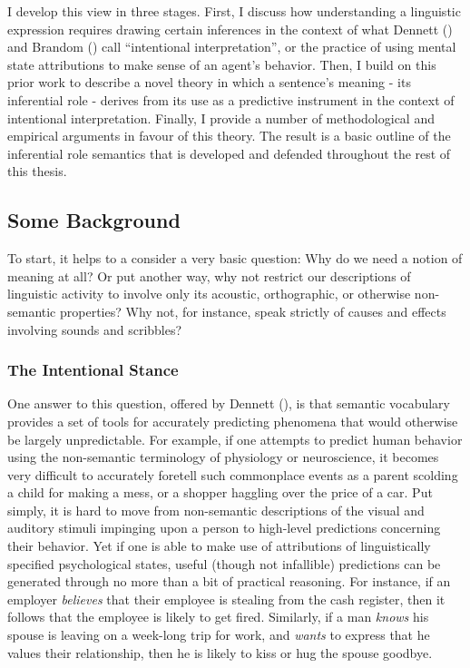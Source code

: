 I develop this view in three stages. First, I discuss how understanding a linguistic expression requires drawing certain inferences in the context of what Dennett (\citeyear{Dennett:1991,Dennett:1987}) and Brandom  (\citeyear{Brandom:1994,Brandom:2000,Brandom:2009}) call ``intentional interpretation'', or the practice of using mental state attributions to make sense of an agent's behavior. Then, I build on this prior work to describe a novel theory in which a sentence's meaning - its inferential role - derives from its use as a predictive instrument in the context of intentional interpretation. Finally, I provide a number of methodological and empirical arguments in favour of this theory. The result is a basic outline of the inferential role semantics that is developed and defended throughout the rest of this thesis. 

\subsection{Some Background}

To start, it helps to a consider a very basic question: Why do we need a notion of meaning at all? Or put another way, why not restrict our descriptions of linguistic activity to involve only its acoustic, orthographic, or otherwise non-semantic properties? Why not, for instance, speak strictly of causes and effects involving sounds and scribbles?

\subsubsection{The Intentional Stance}

One answer to this question, offered by Dennett (\citeyear{Dennett:1991,Dennett:1987}), is that semantic vocabulary provides a set of tools for accurately predicting phenomena that would otherwise be largely unpredictable. For example, if one attempts to predict human behavior using the non-semantic terminology of physiology or neuroscience, it becomes very difficult to accurately foretell such commonplace events as a parent scolding a child for making a mess, or a shopper haggling over the price of a car. Put simply, it is hard to move from non-semantic descriptions of the visual and auditory stimuli impinging upon a person to high-level predictions concerning their behavior. Yet if one is able to make use of attributions of linguistically specified psychological states, useful (though not infallible) predictions can be generated through no more than a bit of practical reasoning. For instance, if an employer \textit{believes} that their employee is stealing from the cash register, then it follows that the employee is likely to get fired. Similarly, if a man \textit{knows} his spouse is leaving on a week-long trip for work, and \textit{wants} to express that he values their relationship, then he is likely to kiss or hug the spouse goodbye. 

